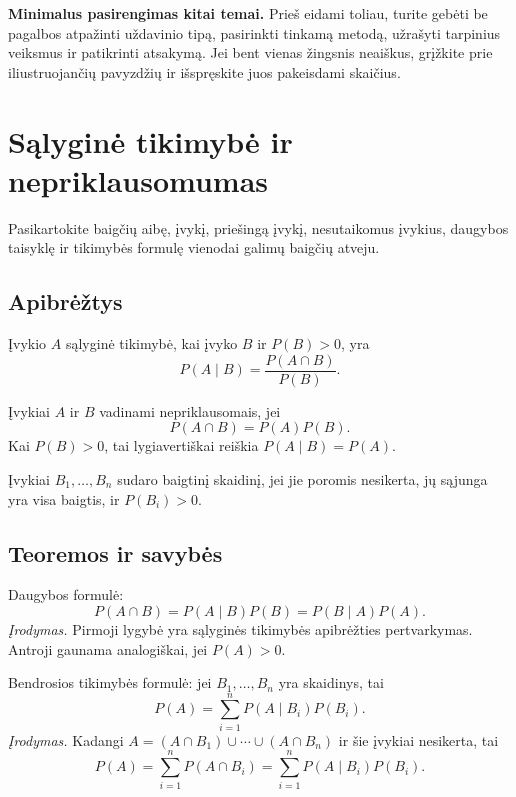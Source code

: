 \textbf{Minimalus pasirengimas kitai temai.} Prieš eidami toliau, turite gebėti be pagalbos atpažinti uždavinio tipą, pasirinkti tinkamą metodą, užrašyti tarpinius veiksmus ir patikrinti atsakymą. Jei bent vienas žingsnis neaiškus, grįžkite prie iliustruojančių pavyzdžių ir išspręskite juos pakeisdami skaičius.

\section{Sąlyginė tikimybė ir nepriklausomumas}\label{sec:salygine-tikimybe-ir-nepriklausomumas}

\begin{tcolorbox}[title=Prieš pradedant, colback=green!5]
Pasikartokite baigčių aibę, įvykį, priešingą įvykį, nesutaikomus įvykius, daugybos taisyklę ir tikimybės formulę vienodai galimų baigčių atveju.
\end{tcolorbox}
\subsection{Apibrėžtys}

\begin{apibreztis}
Įvykio $A$ sąlyginė tikimybė, kai įvyko $B$ ir $P(B)>0$, yra
\[
P(A\mid B)=\frac{P(A\cap B)}{P(B)}.
\]
\end{apibreztis}

\begin{apibreztis}
Įvykiai $A$ ir $B$ vadinami nepriklausomais, jei
\[
P(A\cap B)=P(A)P(B).
\]
Kai $P(B)>0$, tai lygiavertiškai reiškia $P(A\mid B)=P(A)$.
\end{apibreztis}

\begin{apibreztis}
Įvykiai $B_1,\ldots,B_n$ sudaro baigtinį skaidinį, jei jie poromis nesikerta, jų sąjunga yra visa baigtis, ir $P(B_i)>0$.
\end{apibreztis}

\subsection{Teoremos ir savybės}

\begin{teorema}
Daugybos formulė:
\[
P(A\cap B)=P(A\mid B)P(B)=P(B\mid A)P(A).
\]
\emph{Įrodymas.} Pirmoji lygybė yra sąlyginės tikimybės apibrėžties pertvarkymas. Antroji gaunama analogiškai, jei $P(A)>0$.
\end{teorema}

\begin{teorema}
Bendrosios tikimybės formulė: jei $B_1,\ldots,B_n$ yra skaidinys, tai
\[
P(A)=\sum_{i=1}^n P(A\mid B_i)P(B_i).
\]
\emph{Įrodymas.} Kadangi $A=(A\cap B_1)\cup\cdots\cup(A\cap B_n)$ ir šie įvykiai nesikerta, tai
\[
P(A)=\sum_{i=1}^nP(A\cap B_i)=\sum_{i=1}^nP(A\mid B_i)P(B_i).
\]
\end{teorema}

